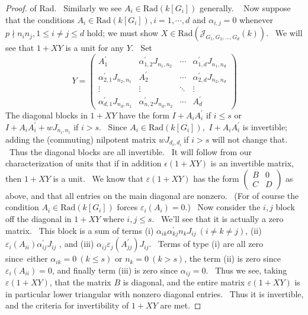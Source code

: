 \documentclass[12pt, a4paper]{amsart}
\numberwithin{equation}{section} %
\theoremstyle{plain}
\theoremstyle{definition}
\theoremstyle{plain}
\theoremstyle{remark}
\newcommand{\ones}{J}
\begin{document}
\begin{proof}
of Rad. \ Similarly we see $A_{i}\in \text{Rad}(k[G_{i}])$ generally. \newline
\ \newline
Now suppose that the conditions $A_{i}\in \text{Rad}(k[G_{i}]),i=1,\cdots ,d$ and $%
\alpha _{i,j}=0$ whenever $p\nmid n_{i}n_{j},1\leq i\neq j\leq d$ hold; we
must show $X\in \text{Rad}(\mathcal{J}_{G_1, G_2, \ldots, G_d}(k))$. \ We will
see that $1+XY$ is a unit for any $Y$. \ Set $\ $%
\[
Y=\left( 
\begin{array}{llll}
A_{1}^{\prime } & \alpha _{1,2}^{\prime }\ones_{n_{1},n_{2}} & \cdots  & \alpha
_{1,d}^{\prime }\ones_{n_{1},n_{d}} \\ 
\alpha _{2,1}^{\prime }\ones_{n_{2},n_{1}} & A_{2}^{\prime } & \cdots  & \alpha
_{2,d}^{\prime }\ones_{n_{2},n_{d}} \\ 
\vdots  & \vdots  & \ddots  & \vdots  \\ 
\alpha _{d,1}^{\prime }\ones_{n_{d},n_{1}} & \alpha _{n,2}^{\prime
}\ones_{n_{d},n_{2}} & \cdots  & A_{d}^{\prime }%
\end{array}%
\right) 
\]%
The diagonal blocks in $1+XY$ have the form $I+A_{i}A_{i}^{\prime }$ if $%
i\leq s$ or $I+A_{i}A_{i}^{\prime }+wJ_{n_{i},n_{i}}$ if $i>s$. \ Since $%
A_{i}\in \text{Rad}(k[G_{i}]),$ $I+A_{i}A_{i}^{\prime }$ is invertible; adding the
(commuting) nilpotent matrix $wJ_{d_{i},d_{i}}\ $if $i>s$ will not change
that. \ Thus the diagonal blocks are all invertible. \ It will follow from
our characterization of units that if in addition $\epsilon (1+XY)$ is an
invertible matrix, then $1+XY$ is a unit. \ We know that $\varepsilon (1+XY)$
has the form $\left( 
\begin{array}{ll}
B & 0 \\ 
C & D%
\end{array}%
\right) $ as above, and that all entries on the main diagonal are nonzero. \
(For of course the condition $A_{i}\in \text{Rad}(k[G_{i}])$ forces $\varepsilon
_{i}(A_{i})=0$.) \ Now consider the $i,j$ block off the diagonal in $1+XY$
where $i,j\leq s$. \ We'll see that it is actually a zero matrix. \ This
block is a sum of terms (i) $\alpha _{ik}\alpha _{kj}^{\prime }n_{k}J_{ij}\
(i\neq k\neq j)$, (ii) $\varepsilon _{i}(A_{ii})\alpha _{ij}^{\prime }J_{ij}$%
, and (iii) $\alpha _{ij}\varepsilon _{j}(A_{jj}^{\prime })J_{ij}$. \ Terms
of type (i) are all zero since\ either $\alpha _{ik}=0\ (k\leq s)$ or $%
n_{k}=0\ (k>s)$, the term (ii) is zero since $\varepsilon _{i}(A_{ii})=0$,
and finally term (iii) is zero since $\alpha _{ij}=0$. \ Thus we see, taking 
$\varepsilon (1+XY)$, that the matrix $B$ is diagonal, and the entire matrix 
$\varepsilon (1+XY)$ is in particular lower triangular with nonzero diagonal
entries. \ Thus it is invertible, and the criteria for invertibility of $1+XY
$ are met.
\end{proof}
\end{document}
